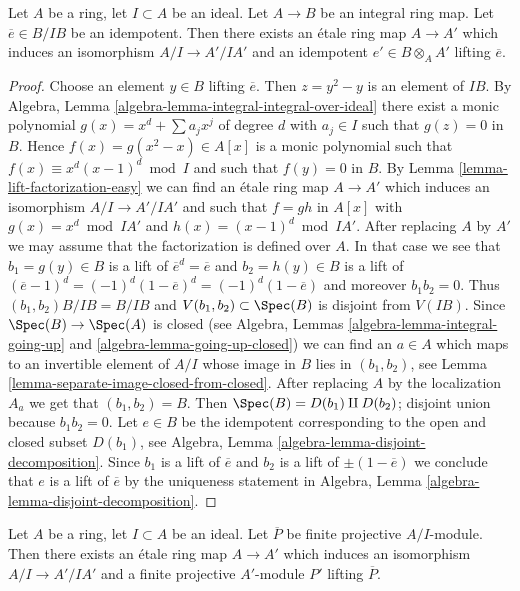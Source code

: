 \begin{lemma}
\label{lemma-lift-idempotent-upstairs}
Let $A$ be a ring, let $I \subset A$ be an ideal.
Let $A \to B$ be an integral ring map.
Let $\overline{e} \in B/IB$ be an idempotent.
Then there exists an \'etale ring map $A \to A'$
which induces an isomorphism $A/I \to A'/IA'$ and an idempotent
$e' \in B \otimes_A A'$ lifting $\overline{e}$.
\end{lemma}

\begin{proof}
Choose an element $y \in B$ lifting $\overline{e}$.
Then $z = y^2 - y$ is an element of $IB$. By
Algebra, Lemma \ref{algebra-lemma-integral-integral-over-ideal}
there exist a monic polynomial
$g(x) = x^d + \sum a_j x^j$ of degree $d$ with $a_j \in I$ such that
$g(z) = 0$ in $B$. Hence $f(x) = g(x^2 - x) \in A[x]$ is a monic
polynomial such that $f(x) \equiv x^d(x - 1)^d \bmod I$
and such that $f(y) = 0$ in $B$.
By Lemma \ref{lemma-lift-factorization-easy}
we can find an \'etale ring map $A \to A'$ which induces
an isomorphism $A/I \to A'/IA'$ and such that $f = gh$
in $A[x]$ with $g(x) = x^d \bmod IA'$ and $h(x) = (x - 1)^d \bmod IA'$.
After replacing $A$ by $A'$ we may assume that the factorization
is defined over $A$. In that case we see that
$b_1 = g(y) \in B$ is a lift of $\overline{e}^d = \overline{e}$ and
$b_2 = h(y) \in B$ is a lift of
$(\overline{e} - 1)^d = (-1)^d (1 - \overline{e})^d = (-1)^d(1 - \overline{e})$
and moreover $b_1b_2 = 0$. Thus $(b_1, b_2)B/IB = B/IB$ and
$V(b_1, b_2) \subset \Spec(B)$ is disjoint from $V(IB)$. Since
$\Spec(B) \to \Spec(A)$ is closed (see
Algebra, Lemmas \ref{algebra-lemma-integral-going-up} and
\ref{algebra-lemma-going-up-closed})
we can find an $a \in A$ which maps to an invertible element
of $A/I$ whose image in $B$ lies in $(b_1, b_2)$, see
Lemma \ref{lemma-separate-image-closed-from-closed}.
After replacing $A$ by the localization $A_a$ we get that
$(b_1, b_2) = B$. Then $\Spec(B) = D(b_1) \amalg D(b_2)$;
disjoint union because $b_1b_2 = 0$. Let $e \in B$ be the idempotent
corresponding to the open and closed subset $D(b_1)$, see
Algebra, Lemma \ref{algebra-lemma-disjoint-decomposition}.
Since $b_1$ is a lift of $\overline{e}$ and $b_2$ is a
lift of $\pm (1 - \overline{e})$ we conclude that $e$ is
a lift of $\overline{e}$ by the uniqueness statement in
Algebra, Lemma \ref{algebra-lemma-disjoint-decomposition}.
\end{proof}

\begin{lemma}
\label{lemma-lift-projective-module}
Let $A$ be a ring, let $I \subset A$ be an ideal.
Let $\overline{P}$ be finite projective $A/I$-module.
Then there exists an \'etale ring map $A \to A'$ which induces
an isomorphism $A/I \to A'/IA'$ and a finite projective
$A'$-module $P'$ lifting $\overline{P}$.
\end{lemma}

